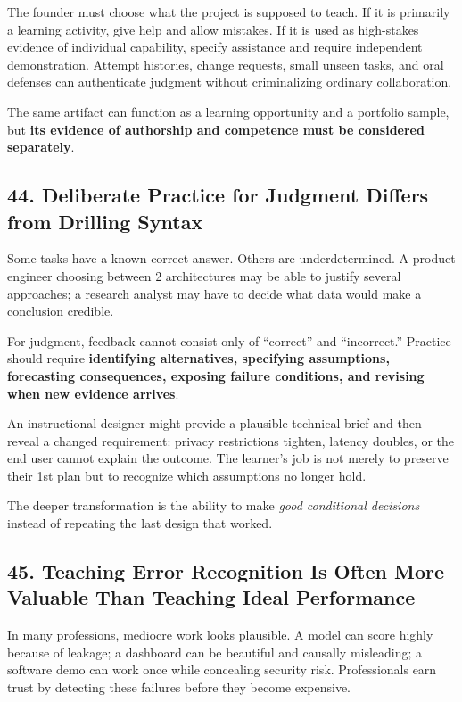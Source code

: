 The founder must choose what the project is supposed to teach. If it is primarily a learning activity, give help and allow mistakes. If it is used as high-stakes evidence of individual capability, specify assistance and require independent demonstration. Attempt histories, change requests, small unseen tasks, and oral defenses can authenticate judgment without criminalizing ordinary collaboration.

The same artifact can function as a learning opportunity and a portfolio sample, but \textbf{its evidence of authorship and competence must be considered separately}.

\subsection*{44. Deliberate Practice for Judgment Differs from Drilling Syntax}

Some tasks have a known correct answer. Others are underdetermined. A product engineer choosing between 2 architectures may be able to justify several approaches; a research analyst may have to decide what data would make a conclusion credible.

For judgment, feedback cannot consist only of ``correct'' and ``incorrect.'' Practice should require \textbf{identifying alternatives, specifying assumptions, forecasting consequences, exposing failure conditions, and revising when new evidence arrives}.

An instructional designer might provide a plausible technical brief and then reveal a changed requirement: privacy restrictions tighten, latency doubles, or the end user cannot explain the outcome. The learner's job is not merely to preserve their 1st plan but to recognize which assumptions no longer hold.

The deeper transformation is the ability to make \emph{good conditional decisions} instead of repeating the last design that worked.

\subsection*{45. Teaching Error Recognition Is Often More Valuable Than Teaching Ideal Performance}

In many professions, mediocre work looks plausible. A model can score highly because of leakage; a dashboard can be beautiful and causally misleading; a software demo can work once while concealing security risk. Professionals earn trust by detecting these failures before they become expensive.

